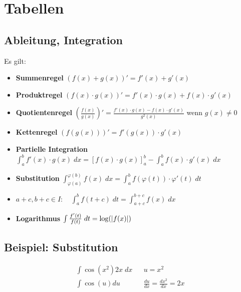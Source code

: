 \section{Tabellen}
\subsection*{Ableitung, Integration}
Es gilt:
\begin{itemize}
  \item \textbf{Summenregel} $ (f (x) + g (x))' = f' (x) + g' (x)$
  \item \textbf{Produktregel} $ (f (x) \cdot g (x))' = f' (x) \cdot g (x) + f (x) \cdot g' (x)$
  \item \textbf{Quotientenregel} $\left( \frac{f (x)}{g (x)} \right)' = \frac{f' (x) \cdot g (x) - f (x) \cdot g' (x)}{g^2 (x)}$ wenn $g (x) \neq 0$
  \item \textbf{Kettenregel} $ (f (g (x)))' = f' (g (x)) \cdot g' (x)$
  \item \textbf{Partielle Integration} $\int_a^b f' (x) \cdot g (x) \; dx = [f (x) \cdot g (x)]_a^b - \int_a^b f (x) \cdot g' (x) \; dx$
  \item \textbf{Substitution} $\int_{\varphi (a)}^{\varphi (b)} f (x) \; dx = \int_a^b f (\varphi (t)) \cdot \varphi' (t) \; dt$
  \item $a+c, b+c \in I: \quad \int_a^b f (t + c) \; dt = \int_{a+c}^{b+c} f (x) \; dx$
  \item \textbf{Logarithmus} $\int \frac{f' (t)}{f (t)} \; dt = \log (\abs{f (x)})$
\end{itemize}
\BoxStart{}
\subsection*{Beispiel: Substitution}
\begin{align*}
  \int \cos (x^2) 2x \; dx &  & u = x^2                              \\
  \int \cos (u) du         &  & \frac{du}{dx} = \frac{dx^2}{dx} = 2x
\end{align*}
\BoxEnd{}
